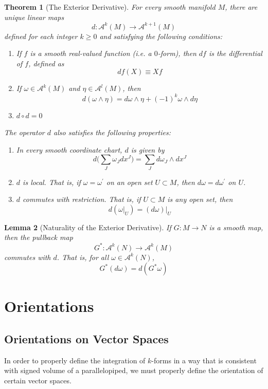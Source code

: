 \documentclass{article}
\newtheorem{theorem}{Theorem}[section]
\newtheorem{lemma}[theorem]{Lemma}
\theoremstyle{remark}
\theoremstyle{definition}
\begin{document}
\begin{theorem}[The Exterior Derivative]
For every smooth manifold $M$, there are unique linear maps
\[d: \mathcal{A}^k (M) \longrightarrow \mathcal{A}^{k+1} (M)\]
defined for each integer $k \geq 0$ and satisfying the following conditions: 
\begin{enumerate}
    \item If $f$ is a smooth real-valued function (i.e. a $0$-form), then $df$ is the differential of $f$, defined as 
    \[df(X) \equiv X f\]
    \item If $\omega \in \mathcal{A}^k (M)$ and $\eta \in \mathcal{A}^l (M)$, then 
    \[d (\omega \wedge \eta) = d \omega \wedge \eta + (-1)^k \omega \wedge d\eta\]
    \item $d \circ d = 0$
\end{enumerate}
The operator $d$ also satisfies the following properties: 
\begin{enumerate}
    \item In every smooth coordinate chart, $d$ is given by 
    \[d \bigg( \sum_J \omega_J dx^J \bigg) = \sum_J d\omega_J \wedge d x^J\]
    \item $d$ is local. That is, if $\omega = \omega^\prime$ on an open set $U \subset M$, then $d\omega = d\omega^\prime$ on $U$. 
    \item $d$ commutes with restriction. That is, if $U \subset M$ is any open set, then 
    \[d (\omega|_U) = (d \omega) \big|_U\]
\end{enumerate}
\end{theorem}

\begin{lemma}[Naturality of the Exterior Derivative]
If $G: M \longrightarrow N$ is a smooth map, then the pullback map
\[G^* : \mathcal{A}^k (N) \longrightarrow \mathcal{A}^k (M)\]
commutes with $d$. That is, for all $\omega \in \mathcal{A}^k (N)$, 
\[G^*(d \omega) = d (G^* \omega) \]
\end{lemma}

\section{Orientations}
\subsection{Orientations on Vector Spaces}
In order to properly define the integration of $k$-forms in a way that is consistent with signed volume of a parallelopiped, we must properly define the orientation of certain vector spaces. 
\end{document}
